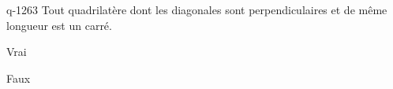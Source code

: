\begin{truefalse}{q-1263}
Tout quadrilatère dont les diagonales sont perpendiculaires et de même longueur est un carré.
\item Vrai
\item* Faux
\end{truefalse}

